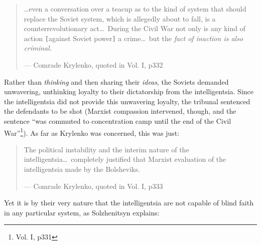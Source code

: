 \documentclass{article}
\begin{document}
\begin{quote}
\ldots even a conversation over a teacup as to the kind of system that should replace the Soviet system, which is allegedly about to fall, is a counterrevolutionary act\ldots~During the Civil War not only is any kind of action \verb|[|against Soviet power\verb|]| a crime\ldots~but the \emph{fact of inaction is also criminal.}

--- Comrade Krylenko, quoted in Vol. I, p332
\end{quote}

Rather than \emph{thinking} and then sharing their \emph{ideas}, the Soviets demanded unwavering, unthinking loyalty to their dictatorship from the intelligentsia.  Since the intelligentsia did not provide this unwavering loyalty, the tribunal sentenced the defendants to be shot (Marxist compassion intervened, though, and the sentence ``was commuted to concentration camp until the end of the Civil War''\footnote{Vol. I, p331}).  As far as Krylenko was concerned, this was just:

\begin{quote}
The political instability and the interim nature of the intelligentsia\ldots~completely justified that Marxist evaluation of the intelligentsia made by the Bolsheviks.

--- Comrade Krylenko, quoted in Vol. I, p333
\end{quote}

Yet it is by their very nature that the intelligentsia are not capable of blind faith in any particular system, as Solzhenitsyn explains:
\end{document}
